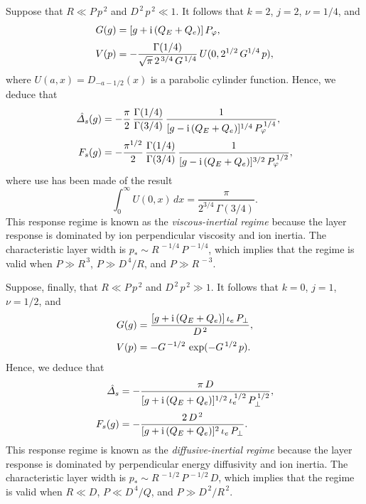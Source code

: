 \documentclass[titlepage=false,12pt]{article}
\begin{document}
Suppose that $R\ll P\,p^{\,2}$ and $D^{\,2}\,p^{\,2} \ll 1$. It follows that $k=2$, $j=2$, $\nu=1/4$, and
\begin{align}
G(g) &= [g+{\rm i}\,(Q_E+Q_e)]\,P_\varphi,\\[0.5ex]
V(p)&= - \frac{\Gamma(1/4)}{\sqrt{\pi}\,2^{\,3/4}\,G^{\,1/4}}\,U(0,2^{1/2}\,G^{1/4}\,p),
\end{align}
where $U(a,x)=D_{-a-1/2}(x)$ is a parabolic cylinder function.
Hence, we deduce that
\begin{align}\label{evia}
\hat{\mit\Delta}_s(g) &=- \frac{\pi}{2}\,\frac{\Gamma(1/4)}{\Gamma(3/4)}\,\frac{1}{[g-{\rm i}\,(Q_E+Q_e)]^{1/4}\,P_\varphi^{\,1/4}},\\[0.5ex]
F_s(g) &= - \frac{\pi^{1/2}}{2}\,\frac{\Gamma(1/4)}{\Gamma(3/4)}\,\frac{1}{[g-{\rm i}\,(Q_E+Q_e)]^{3/2}\,P_\varphi^{\,1/2}},\label{evib}
\end{align}
where use has been made of the result
\begin{equation}
\int_0^\infty U(0,x)\,dx= \frac{\pi}{2^{3/4}\,\Gamma(3/4)}.
\end{equation}
This response regime is known as the {\em viscous-inertial regime}\/ because the layer response is dominated by
ion perpendicular viscosity and ion inertia. 
 The characteristic layer width is $p_\ast \sim R^{\,-1/4}\,P^{\,-1/4}$,
which implies that the regime is valid when $P\gg R^{\,3}$, $P\gg D^{\,4}/R$, and $P\gg R^{\,-3}$. 

Suppose, finally, that $R\ll P\,p^{\,2}$ and $D^{\,2}\,p^{\,2}\gg 1$. It follows that $k=0$, $j=1$, $\nu=1/2$, and
\begin{align}
G(g) &= \frac{[g+{\rm i}\,(Q_E+Q_e)]\,\iota_e\,P_\perp}{D^{\,2}},\\[0.5ex]
V(p)&= -G^{\,-1/2}\,\exp(-G^{\,1/2}\,p).
\end{align}
Hence, we deduce that
\begin{align}\label{edia}
\hat{\mit\Delta}_s&= -\frac{\pi\,D}{[g+{\rm i}\,(Q_E+Q_e)]^{1/2}\,\iota_e^{\,1/2}\,P_\perp^{\,1/2}},\\[0.5ex]
F_s(g) &= - \frac{2\,D^{\,2}}{[g+{\rm i}\,(Q_E+Q_e)]^2\,\iota_e\,P_\perp}.\label{edib}
\end{align}
This response regime is known as the {\em diffusive-inertial regime}\/ because the
layer response is dominated by perpendicular energy diffusivity and ion inertia. The characteristic layer width is $p_\ast\sim
R^{\,-1/2}\,P^{\,-1/2}\,D$, which implies that the regime is valid when $R\ll D$, $P\ll D^{\,4}/Q$, and $P\gg D^{\,2}/R^{\,2}$. 
\end{document}
